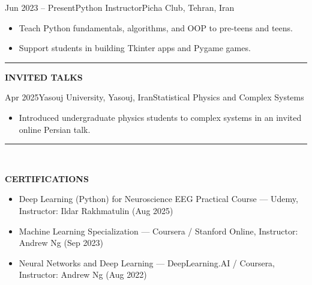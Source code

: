 \documentclass[12pt, b4paper]{cv}
\begin{document}
\vspace{-0.1in}

\begin{work}{Jun 2023 -- Present}{Python Instructor}{Picha Club, Tehran, Iran}
\vspace{-0.1in}
\begin{itemize}
		\item Teach Python fundamentals, algorithms, and OOP to pre-teens and teens.
		\item Support students in building Tkinter apps and Pygame games.
	\end{itemize}
\end{work}




\vspace{-0.15in}
\rule{\textwidth}{1pt}
\vspace{-0.15in}



{\Large \textbf{INVITED TALKS}}
\vspace{0.1in}

\begin{school}{Apr 2025}{Yasouj University, Yasouj, Iran}{Statistical Physics and Complex Systems}
\vspace{-0.1in}
\begin{itemize}
	\item Introduced undergraduate physics students to complex systems in an invited online Persian talk.
\end{itemize}
\end{school}



\vspace{-0.15in}
\rule{\textwidth}{1pt}\\
\vspace{-0.15in}

{\Large \textbf{CERTIFICATIONS}}
\vspace{-5pt}

\begin{itemize}
    \item Deep Learning (Python) for Neuroscience EEG Practical Course — Udemy, Instructor: Ildar Rakhmatulin (Aug 2025)
    \item Machine Learning Specialization — Coursera / Stanford Online, Instructor: Andrew Ng (Sep 2023)
    \item Neural Networks and Deep Learning — DeepLearning.AI / Coursera, Instructor: Andrew Ng (Aug 2022)
\end{itemize}
\end{document}
